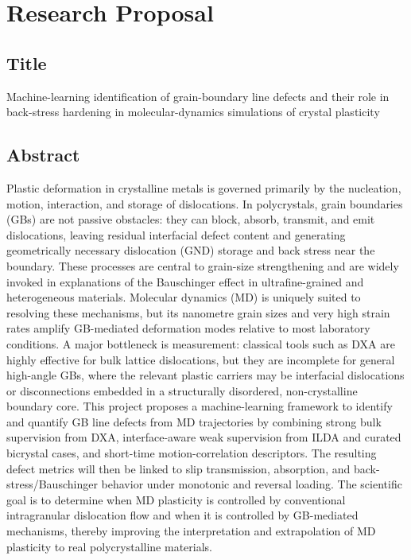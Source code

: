 \section*{Research Proposal}

\subsection*{Title}
Machine-learning identification of grain-boundary line defects and their role in back-stress hardening in molecular-dynamics simulations of crystal plasticity

\subsection*{Abstract}
Plastic deformation in crystalline metals is governed primarily by the nucleation, motion, interaction, and storage of dislocations. In polycrystals, grain boundaries (GBs) are not passive obstacles: they can block, absorb, transmit, and emit dislocations, leaving residual interfacial defect content and generating geometrically necessary dislocation (GND) storage and back stress near the boundary. These processes are central to grain-size strengthening and are widely invoked in explanations of the Bauschinger effect in ultrafine-grained and heterogeneous materials. Molecular dynamics (MD) is uniquely suited to resolving these mechanisms, but its nanometre grain sizes and very high strain rates amplify GB-mediated deformation modes relative to most laboratory conditions. A major bottleneck is measurement: classical tools such as DXA are highly effective for bulk lattice dislocations, but they are incomplete for general high-angle GBs, where the relevant plastic carriers may be interfacial dislocations or disconnections embedded in a structurally disordered, non-crystalline boundary core. This project proposes a machine-learning framework to identify and quantify GB line defects from MD trajectories by combining strong bulk supervision from DXA, interface-aware weak supervision from ILDA and curated bicrystal cases, and short-time motion-correlation descriptors. The resulting defect metrics will then be linked to slip transmission, absorption, and back-stress/Bauschinger behavior under monotonic and reversal loading. The scientific goal is to determine when MD plasticity is controlled by conventional intragranular dislocation flow and when it is controlled by GB-mediated mechanisms, thereby improving the interpretation and extrapolation of MD plasticity to real polycrystalline materials.

